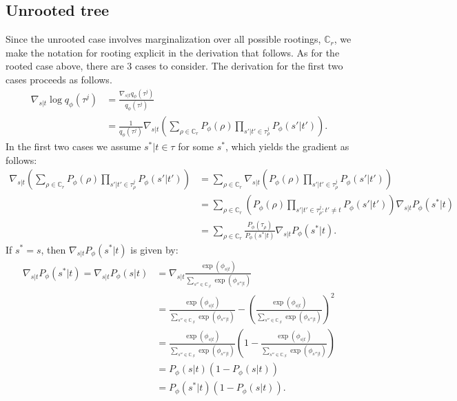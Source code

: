 \documentclass{article}
\begin{document}
\subsection*{Unrooted tree}
Since the unrooted case involves marginalization over all possible rootings, $\mathbb{C}_r$, we make the notation for rooting explicit in the derivation that follows.
As for the rooted case above, there are 3 cases to consider.
The derivation for the first two cases proceeds as follows.
\begin{align*}
    \nabla_{s|t} \log q_{\phi}(\tau^j)
    &= \frac{\nabla_{s|t} q_{\phi}(\tau^j)}{q_{\phi}(\tau^j)} \\
    &= \frac{1}{q_{\phi}(\tau^j)} \nabla_{s|t} \left( \sum\limits_{\rho \in \mathbb{C}_{r}} P_{\phi}(\rho) \prod\limits_{s'|t' \in \tau_{\rho}^j} P_{\phi}(s' | t') \right).
\end{align*}
In the first two cases we assume $s^*|t \in \tau$ for some $s^*$, which yields the gradient as follows:
\begin{align*}
    \nabla_{s|t} \left( \sum\limits_{\rho \in \mathbb{C}_{r}} P_{\phi}(\rho) \prod\limits_{s'|t' \in \tau_{\rho}^j} P_{\phi}(s' | t') \right) &= \sum\limits_{\rho \in \mathbb{C}_{r}} \nabla_{s|t} \left( P_{\phi}(\rho) \prod\limits_{s'|t' \in \tau_{\rho}^j} P_{\phi}(s' | t') \right) \\
    &= \sum\limits_{\rho \in \mathbb{C}_{r}} \left( P_{\phi}(\rho) \prod\limits_{s'|t' \in \tau_{\rho}^j : t' \not= t } P_{\phi}(s' | t') \right) \nabla_{s|t} P_{\phi}(s^*|t) \\
    &= \sum\limits_{\rho \in \mathbb{C}_{r}} \frac{P_\phi(\tau_{\rho})}{P_{\phi}(s^*|t)} \nabla_{s|t} P_{\phi}(s^*|t).
\end{align*}
If $s^* = s$, then $\nabla_{s|t} P_{\phi}(s^*|t)$ is given by:
\begin{align*}
    \nabla_{s|t} P_{\phi}(s^*|t) = \nabla_{s|t} P_{\phi}(s|t) &= \nabla_{s|t} \frac{\exp(\phi_{s|t})}{\sum\limits_{s'' \in \mathbb{C}_{.|t}} \exp(\phi_{s''|t})} \\
    &= \frac{\exp(\phi_{s|t})}{\sum\limits_{s'' \in \mathbb{C}_{.|t}} \exp(\phi_{s''|t})} - \left(\frac{\exp(\phi_{s|t})}{\sum\limits_{s'' \in \mathbb{C}_{.|t}} \exp(\phi_{s''|t})}\right)^2 \\
    &= \frac{\exp(\phi_{s|t})}{\sum\limits_{s'' \in \mathbb{C}_{.|t}} \exp(\phi_{s''|t})} \left(1 - \frac{\exp(\phi_{s|t})}{\sum\limits_{s'' \in \mathbb{C}_{.|t}} \exp(\phi_{s''|t})}\right) \\
    &= P_{\phi}(s|t) (1 - P_{\phi}(s|t)) \\
    &= P_{\phi}(s^*|t) (1 - P_{\phi}(s|t)).
\end{align*}
\end{document}
